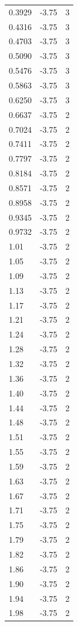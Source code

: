 \begin{longtable}{lrr}
  0.3929 & -3.75 & 3 \\
  0.4316 & -3.75 & 3 \\
  0.4703 & -3.75 & 3 \\
  0.5090 & -3.75 & 3 \\
  0.5476 & -3.75 & 3 \\
  0.5863 & -3.75 & 3 \\
  0.6250 & -3.75 & 3 \\
  0.6637 & -3.75 & 2 \\
  0.7024 & -3.75 & 2 \\
  0.7411 & -3.75 & 2 \\
  0.7797 & -3.75 & 2 \\
  0.8184 & -3.75 & 2 \\
  0.8571 & -3.75 & 2 \\
  0.8958 & -3.75 & 2 \\
  0.9345 & -3.75 & 2 \\
  0.9732 & -3.75 & 2 \\
  1.01 & -3.75 & 2 \\
  1.05 & -3.75 & 2 \\
  1.09 & -3.75 & 2 \\
  1.13 & -3.75 & 2 \\
  1.17 & -3.75 & 2 \\
  1.21 & -3.75 & 2 \\
  1.24 & -3.75 & 2 \\
  1.28 & -3.75 & 2 \\
  1.32 & -3.75 & 2 \\
  1.36 & -3.75 & 2 \\
  1.40 & -3.75 & 2 \\
  1.44 & -3.75 & 2 \\
  1.48 & -3.75 & 2 \\
  1.51 & -3.75 & 2 \\
  1.55 & -3.75 & 2 \\
  1.59 & -3.75 & 2 \\
  1.63 & -3.75 & 2 \\
  1.67 & -3.75 & 2 \\
  1.71 & -3.75 & 2 \\
  1.75 & -3.75 & 2 \\
  1.79 & -3.75 & 2 \\
  1.82 & -3.75 & 2 \\
  1.86 & -3.75 & 2 \\
  1.90 & -3.75 & 2 \\
  1.94 & -3.75 & 2 \\
  1.98 & -3.75 & 2 \\

\end{longtable}
